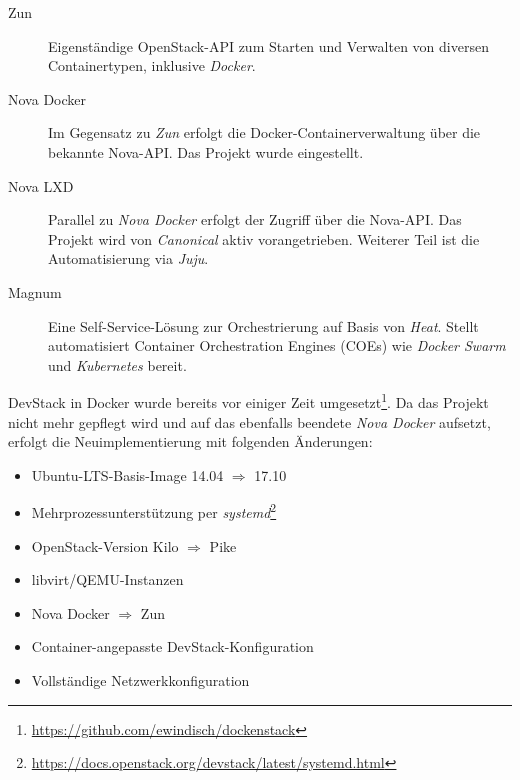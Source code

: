 \begin{description}
	
	\item[Zun\footnotemark] Eigenständige OpenStack-API zum Starten und Verwalten von diversen Containertypen, inklusive \emph{Docker}.
	
	\item[Nova Docker\footnotemark] Im Gegensatz zu \emph{Zun} erfolgt die Docker-Containerverwaltung über die bekannte Nova-API. Das Projekt wurde eingestellt.
	
	\item[Nova LXD\footnotemark] Parallel zu \emph{Nova Docker} erfolgt der Zugriff über die Nova-API. Das Projekt wird von \emph{Canonical} aktiv vorangetrieben. Weiterer Teil ist die Automatisierung via \emph{Juju}.
	
	\item[Magnum\footnotemark] Eine Self-Service-Lösung zur Orchestrierung auf Basis von \emph{Heat}. Stellt automatisiert Container Orchestration Engines (COEs) wie \emph{Docker Swarm} und \emph{Kubernetes} bereit.
	
\end{description}

DevStack in Docker wurde bereits vor einiger Zeit umgesetzt\footnote{\url{https://github.com/ewindisch/dockenstack}}. Da das Projekt nicht mehr gepflegt wird und auf das ebenfalls beendete \emph{Nova Docker} aufsetzt, erfolgt die Neuimplementierung mit folgenden Änderungen:

\begin{itemize}
	
	\item Ubuntu-LTS-Basis-Image 14.04 $\Rightarrow$ 17.10
	\item Mehrprozessunterstützung per \emph{systemd}\footnote{\url{https://docs.openstack.org/devstack/latest/systemd.html}}
	\item OpenStack-Version Kilo $\Rightarrow$ Pike
	\item libvirt/QEMU-Instanzen
	\item Nova Docker $\Rightarrow$ Zun
	\item Container-angepasste DevStack-Konfiguration
	\item Vollständige Netzwerkkonfiguration
	
\end{itemize}

